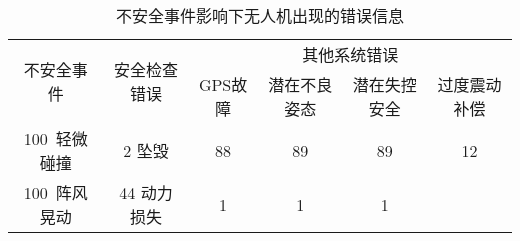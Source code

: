 \begin{table}[ht]
\caption{不安全事件影响下无人机出现的错误信息}
\label{tab:check_crash_err}
\centering
\begin{threeparttable}
\begin{tabular}{c|c|c|c|c|c}
        \toprule[1.5pt]
        \multirow{2}{*}{不安全事件} & \multirow{2}{*}{安全检查错误} & \multicolumn{4}{c}{其他系统错误}\\
        \cline{3-6}
          &  & GPS故障 & 潜在不良姿态 & 潜在失控安全 & 过度震动补偿  \\
        \midrule[0.8pt]
         100~轻微碰撞 & 2 坠毁 & 88 & 89 & 89 & 12  \\
         
         100~阵风晃动 & 44 动力损失 & 1 & 1 & 1 & \diagbox{}{}  \\
        \bottomrule[1.5pt]
\end{tabular}
\end{threeparttable}
\end{table}
